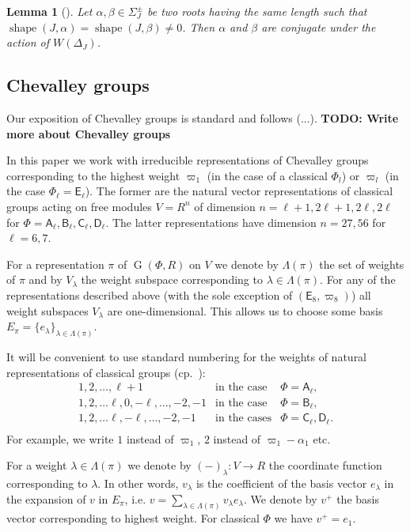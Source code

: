 \documentclass[12pt]{amsart}
\numberwithin{equation}{section}
\newtheorem{lemma}[lemmacounter]{Lemma}
\theoremstyle{definition}
\DeclareMathOperator{\G}{G}
\DeclareMathOperator{\shape}{shape}
\newcommand{\rA}{\mathsf{A}}
\newcommand{\rB}{\mathsf{B}}
\newcommand{\rC}{\mathsf{C}}
\newcommand{\rD}{\mathsf{D}}
\newcommand{\rE}{\mathsf{E}}
\begin{document}
\begin{lemma}[{\cite[Lemma~1]{ABS}}]\label{lemma:abs}
Let $\alpha, \beta \in \Sigma^\pm_J$ be two roots having the same length such that $\shape(J,\alpha)=\shape(J,\beta)\neq 0$.
Then $\alpha$ and $\beta$ are conjugate under the action of $W(\Delta_J)$.
\end{lemma}

\subsection{Chevalley groups}
Our exposition of Chevalley groups is standard and follows (...).
\textbf{TODO: Write more about Chevalley groups}

In this paper we work with irreducible representations of Chevalley groups corresponding to the highest weight
$\varpi_1$ (in the case of a classical $\Phi_l$) or $\varpi_l$ (in the case $\Phi_\ell=\rE_\ell$). 
The former are the natural vector representations of classical groups acting on free modules $V=R^n$ of dimension 
$n=\ell+1, 2\ell+1, 2\ell,2\ell$ for $\Phi=\rA_\ell,\rB_\ell,\rC_\ell,\rD_\ell$.
The latter representations have dimension $n=27, 56$ for $\ell=6,7$.

For a representation $\pi$ of $\G(\Phi, R)$ on $V$ we denote by $\Lambda(\pi)$ the set of weights of $\pi$ and by $V_\lambda$ the weight subspace corresponding to $\lambda\in\Lambda(\pi)$.
For any of the representations described above (with the sole exception of $(\rE_8, \varpi_8)$) all weight subspaces $V_\lambda$ are one-dimensional. 
This allows us to choose some basis $E_\pi=\{e_\lambda\}_{\lambda\in\Lambda(\pi)}$.

It will be convenient to use standard numbering for the weights of natural representations of classical groups (cp.~\cite[§1B]{St78}):
$$\begin{array}{cll}
  1,2,\ldots, \ell+1 & \text{in the case} & \Phi =\rA_\ell, \\
  1,2,\ldots \ell, 0, -\ell,\ldots, -2, -1 & \text{in the case} & \Phi =\rB_\ell, \\
  1,2,\ldots \ell, -\ell,\ldots, -2, -1 & \text{in the cases}   & \Phi =\rC_\ell, \rD_\ell. \\
\end{array}$$
For example, we write $1$ instead of $\varpi_1$, $2$ instead of $\varpi_1-\alpha_1$ etc.

For a weight $\lambda\in \Lambda(\pi)$ we denote by $(-)_\lambda\colon V\rightarrow R$ the coordinate function corresponding to $\lambda$.
In other words,  $v_\lambda$ is the coefficient of the basis vector $e_\lambda$ in the expansion of $v$ in $E_\pi$, i.e. $v=\sum_{\lambda\in \Lambda(\pi)} v_\lambda e_\lambda$.
We denote by $v^+$ the basis vector corresponding to highest weight.
For classical $\Phi$ we have $v^+=e_1$.
\end{document}
